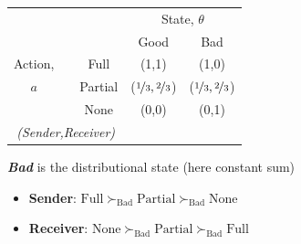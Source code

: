 \documentclass{beamer}
\begin{document}
\begin{frame}
\begin{card}[Payoffs]
	\begin{center}%
		\begin{tabular}{c|cc|c|c|}
		\multicolumn{1}{c}{} &  & \multicolumn{1}{c}{} & \multicolumn{2}{c}{State, $\theta$} \\ 
		\cline{4-5} 
		\multicolumn{1}{c}{} &  & \multicolumn{1}{c}{} & \multicolumn{1}{c}{Good} & \multicolumn{1}{c}{Bad} \\ 
		\cline{4-5} 
		Action, &  & Full & (1,1) & (1,0) \\ 
		\cline{4-5} 
		$a$ &  & Partial & ($\nicefrac{1}{3},\nicefrac{2}{3}$) & ($\nicefrac{1}{3},\nicefrac{2}{3}$) \\ 
		\cline{4-5} 
		 &  & None & (0,0) & (0,1) \\ 
		\cline{4-5} 
		\multicolumn{3}{c}{\emph{(Sender,Receiver)}} & \multicolumn{1}{c}{} & \multicolumn{1}{c}{} \\ 
		\end{tabular}
	\end{center}
\end{card}
\begin{card}
\textbf{\emph{Bad}} is the distributional state (here constant sum)
            \begin{itemize}
                \item \textbf{Sender}: $\text{Full}\succ_{\text{Bad}}\text{Partial}\succ_{\text{Bad}}\text{None}$ 
                \item \textbf{Receiver}: $\text{None}\succ_{\text{Bad}}\text{Partial}\succ_{\text{Bad}}\text{Full}$ 
            \end{itemize}
\end{card}
\end{frame}
\end{document}

